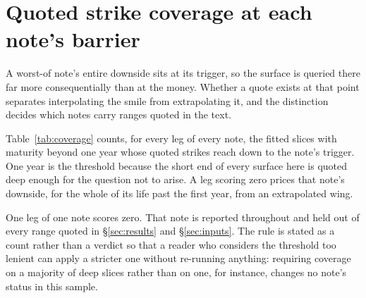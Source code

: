 \section{Quoted strike coverage at each note's barrier}\label{app:coverage}

A worst-of note's entire downside sits at its trigger, so the surface is queried
there far more consequentially than at the money. Whether a quote exists at that
point separates interpolating the smile from extrapolating it, and the
distinction decides which notes carry ranges quoted in the text.

Table~\ref{tab:coverage} counts, for every leg of every note, the fitted slices
with maturity beyond one year whose quoted strikes reach down to the note's
trigger. One year is the threshold because the short end of every surface here
is quoted deep enough for the question not to arise. A leg scoring zero prices
that note's downside, for the whole of its life past the first year, from an
extrapolated wing.

One leg of one note scores zero. That note is reported throughout and held out
of every range quoted in \S\ref{sec:results} and \S\ref{sec:inputs}. The rule
is stated as a count rather than a verdict so that a reader who considers the
threshold too lenient can apply a stricter one without re-running anything:
requiring coverage on a majority of deep slices rather than on one, for
instance, changes no note's status in this sample.


